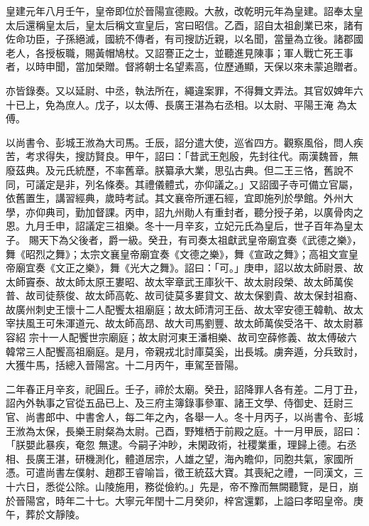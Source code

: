 \begin{pinyinscope}
 皇建元年八月壬午，皇帝即位於晉陽宣德殿。大赦，改乾明元年為皇建。詔奉太皇太后還稱皇太后，皇太后稱文宣皇后，宮曰昭信。乙酉，詔自太祖創業已來，諸有佐命功臣，子孫絕滅，國統不傳者，有司搜訪近親，以名聞，當量為立後。諸郡國老人，各授板職，賜黃帽鳩杖。又詔謇正之士，並聽進見陳事；軍人戰亡死王事者，以時申聞，當加榮贈。督將朝士名望素高，位歷通顯，天保以來未蒙追贈者。



 亦皆錄奏。又以延尉、中丞，執法所在，繩違案罪，不得舞文弄法。其官奴婢年六十已上，免為庶人。戊子，以太傅、長廣王湛為右丞相。以太尉、平陽王淹
 為太傅。



 以尚書令、彭城王浟為大司馬。壬辰，詔分遣大使，巡省四方。觀察風俗，問人疾苦，考求得失，搜訪賢良。甲午，詔曰：「昔武王剋殷，先封往代。兩漢魏晉，無廢茲典。及元氏統歷，不率舊章。朕纂承大業，思弘古典。但二王三恪，舊說不同，可議定是非，列名條奏。其禮儀體式，亦仰議之。」又詔國子寺可備立官屬，依舊置生，講習經典，歲時考試。其文襄帝所運石經，宜即施列於學館。外州大學，亦仰典司，勤加督課。丙申，詔九州勛人有重封者，聽分授子弟，以廣骨肉之恩。九月壬申，詔議定三祖樂。冬十一月辛亥，立妃元氏為皇后，世子百年為皇太子。
 賜天下為父後者，爵一級。癸丑，有司奏太祖獻武皇帝廟宜奏《武德之樂》，舞《昭烈之舞》；太宗文襄皇帝廟宜奏《文德之樂》，舞《宣政之舞》；高祖文宣皇帝廟宜奏《文正之樂》，舞《光大之舞》。詔曰：「可。」庚申，詔以故太師尉景、故太師竇泰、故太師太原王婁昭、故太宰章武王庫狄干、故太尉段榮、故太師萬俟普、故司徒蔡俊、故太師高乾、故司徒莫多婁貸文、故太保劉貴、故太保封祖裔、故廣州刺史王懷十二人配饗太祖廟庭；故太師清河王岳、故太宰安德王韓軌、故太宰扶風王可朱渾道元、故太師高昂、故大司馬劉豐、故太師萬俟受洛干、故太尉慕容紹
 宗十一人配饗世宗廟庭；故太尉河東王潘相樂、故司空薛修義、故太傅破六韓常三人配饗高祖廟庭。是月，帝親戎北討庫莫奚，出長城。虜奔遁，分兵致討，大獲牛馬，括總入晉陽宮。十二月丙午，車駕至晉陽。



 二年春正月辛亥，祀圓丘。壬子，禘於太廟。癸丑，詔降罪人各有差。二月丁丑，詔內外執事之官從五品已上、及三府主簿錄事參軍、諸王文學、侍御史、廷尉三官、尚書郎中、中書舍人，每二年之內，各舉一人。冬十月丙子，以尚書令、彭城王浟為太保，長樂王尉粲為太尉。己酉，野雉栖于前殿之庭。十一月甲辰，詔曰：「朕嬰此暴疾，奄忽
 無逮。今嗣子沖眇，未閑政術，社稷業重，理歸上德。右丞相、長廣王湛，研機測化，體道居宗，人雄之望，海內瞻仰，同胞共氣，家國所憑。可遣尚書左僕射、趙郡王睿喻旨，徵王統茲大寶。其喪紀之禮，一同漢文，三十六日，悉從公除。山陵施用，務從儉約。」先是，帝不豫而無闕聽覽，是日，崩於晉陽宮，時年二十七。大寧元年閏十二月癸卯，梓宮還鄴，上謚曰孝昭皇帝。庚午，葬於文靜陵。




\end{pinyinscope}

